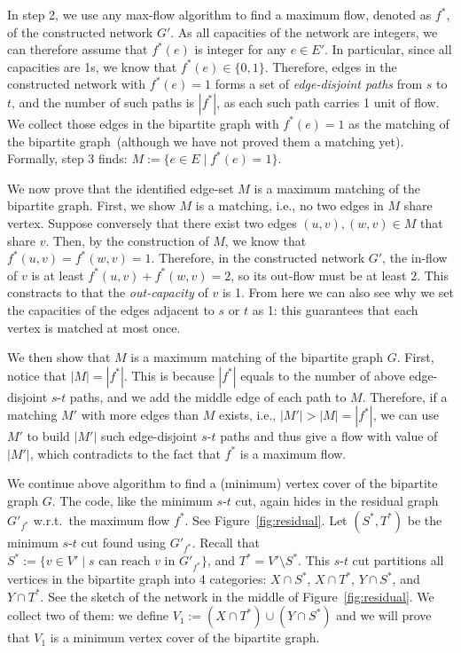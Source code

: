 In step 2, we use any max-flow algorithm to find a maximum flow, denoted as $f^*$,
of the constructed network $G'$. As all capacities of the network are integers,
we can therefore assume that $f^*(e)$ is integer for any $e\in E'$.
In particular, since all capacities are 1s, we know that $f^*(e) \in \{0, 1\}$.
Therefore, edges in the constructed network with $f^*(e) = 1$ forms a set of \emph{edge-disjoint paths}
from $s$ to $t$, and the number of such paths is $|f^*|$, as each such path
carries 1 unit of flow. We collect those edges in the bipartite graph with $f^*(e) = 1$
as the matching of the bipartite graph~(although we have not proved them a matching yet).
Formally, step 3 finds: $M := \{e\in E\mid f^*(e) = 1\}$.


We now prove that the identified edge-set $M$ is a maximum matching of the bipartite graph.
First, we show $M$ is a matching, i.e., no two edges in $M$
share vertex. Suppose conversely that there exist two edges $(u,v), (w,v)\in M$ that share $v$.
Then, by the construction of $M$, we know that $f^*(u,v) = f^*(w,v) = 1$.
Therefore, in the constructed network $G'$, the in-flow of $v$ is at least $f^*(u,v) + f^*(w,v) = 2$,
so its out-flow must be at least 2. This constracts to that the \emph{out-capacity} of $v$
is 1. From here we can also see why we set the capacities of the edges adjacent to $s$ or $t$
as 1: this guarantees that each vertex is matched at most once.

We then show that $M$ is a maximum matching of the bipartite graph $G$.
First, notice that $|M| = |f^*|$. This is because $|f^*|$ equals to the
number of above edge-disjoint $s$-$t$ paths, and we add the middle
edge of each path to $M$.  Therefore, if a matching $M'$ with more edges than $M$ exists, i.e., $|M'| > |M| = |f^*|$,
we can use $M'$ to build $|M'|$ such edge-disjoint $s$-$t$ paths and thus 
give a flow with value of $|M'|$, which contradicts to the fact that $f^*$ is a maximum flow.




We continue above algorithm to find a (minimum) vertex cover of the bipartite graph $G$.
The code, like the minimum $s$-$t$ cut, again hides in the residual graph $G'_{f^*}$ w.r.t.\ the maximum flow $f^*$.
See Figure~\ref{fig:residual}. Let $(S^*, T^*)$ be the minimum $s$-$t$ cut found using $G'_{f^*}$.
Recall that $S^* := \{v\in V'\mid s \textrm{ can reach $v$ in } G'_{f^*} \}$, and $T^* = V'\setminus S^*$.
This $s$-$t$ cut partitions all vertices in the bipartite graph into 4 categories:
$X\cap S^*$, $X\cap T^*$, $Y\cap S^*$, and $Y\cap T^*$.
See the sketch of the network in the middle of Figure~\ref{fig:residual}.
We collect two of them: we define $V_1 := (X\cap T^*)\cup (Y\cap S^*)$ 
and we will prove that $V_1$ is a minimum vertex cover of the bipartite graph.

